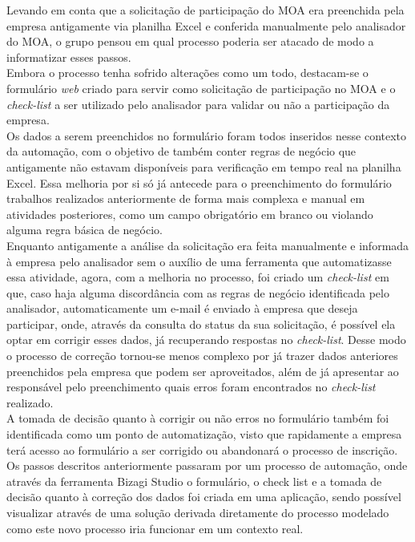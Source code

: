 Levando em conta que a solicitação de participação do MOA era preenchida pela empresa antigamente via planilha Excel e conferida manualmente pelo analisador do MOA, o grupo pensou em qual processo poderia ser atacado de modo a informatizar esses passos.
\\ \indent Embora o processo tenha sofrido alterações como um todo, destacam-se o formulário \emph{web} criado para servir como solicitação de participação no MOA e o \emph{check-list} a ser utilizado pelo analisador para validar ou não a participação da empresa.
\\ \indent Os dados a serem preenchidos no formulário foram todos inseridos nesse contexto da automação, com o objetivo de também conter regras de negócio que antigamente não estavam disponíveis para verificação em tempo real na planilha Excel. Essa melhoria por si só já antecede para o preenchimento do formulário trabalhos realizados anteriormente de forma mais complexa e manual em atividades posteriores, como um campo obrigatório em branco ou violando alguma regra básica de negócio.
\\ \indent Enquanto antigamente a análise da solicitação era feita manualmente e informada à empresa pelo analisador sem o auxílio de uma ferramenta que automatizasse essa atividade, agora, com a melhoria no processo, foi criado um \emph{check-list} em que, caso haja alguma discordância com as regras de negócio identificada pelo analisador, automaticamente um e-mail é enviado à empresa que deseja participar, onde, através da consulta do status da sua solicitação, é possível ela optar em corrigir esses dados, já recuperando respostas no \emph{check-list}. Desse modo o processo de correção tornou-se menos complexo por já trazer dados anteriores preenchidos pela empresa que podem ser aproveitados, além de já apresentar ao responsável pelo preenchimento quais erros foram encontrados no \emph{check-list} realizado. 
\\ \indent A tomada de decisão quanto à corrigir ou não erros no formulário também foi identificada como um ponto de automatização, visto que rapidamente a empresa terá acesso ao formulário a ser corrigido ou abandonará o processo de inscrição.
\\ \indent Os passos descritos anteriormente passaram por um processo de automação, onde através da ferramenta Bizagi Studio o formulário, o check list e a tomada de decisão quanto à correção dos dados foi criada em uma aplicação, sendo possível visualizar através de uma solução derivada diretamente do processo modelado como este novo processo iria funcionar em um contexto real.
